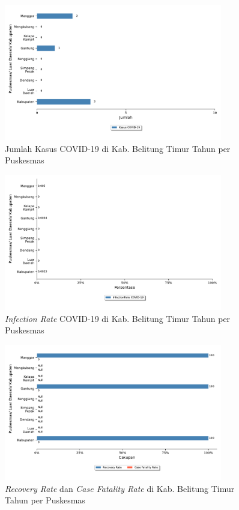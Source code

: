 \begin{figure}[H]
	\centering
	\includegraphics[width=0.85\textwidth]{bab_06/bab_06_17a_kasusCovid}
	\caption{Jumlah Kasus COVID-19 di Kab. Belitung Timur Tahun \tP per Puskesmas}
	\label{fig:Kasus-COVID}
\end{figure}

\begin{figure}[H]
	\centering
	\includegraphics[width=0.85\textwidth]{bab_06/bab_06_17b_infectionRateCovid}
	\caption{\emph{Infection Rate} COVID-19 di Kab. Belitung Timur Tahun \tP per Puskesmas}
	\label{fig:IR-COVID}
\end{figure}

\begin{figure}[H]
	\centering
	\includegraphics[width=0.85\textwidth]{bab_06/bab_06_17c_kasusCovidKesembuhan}
	\caption{\emph{Recovery Rate} dan \emph{Case Fatality Rate} di Kab. Belitung Timur Tahun \tP per Puskesmas}
	\label{fig:RR-COVID}
\end{figure}

